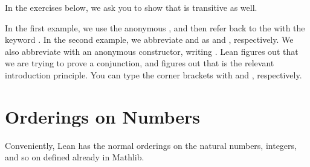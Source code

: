 \documentclass[letterpaper,10pt,english]{sphinxmanual}
\begin{document}
\sphinxAtStartPar
In the exercises below, we ask you to show that  is transitive as well.

\sphinxAtStartPar
In the first example,
we use the anonymous ,
and then refer back to the  with the keyword .
In the second example,
we abbreviate  and  as  and ,
respectively.
We also abbreviate  with an anonymous constructor,
writing .
Lean figures out that we are trying to prove a conjunction,
and figures out that  is the relevant introduction principle.
You can type the corner brackets with \sphinxcode{\sphinxupquote{\textbackslash{}<}} and \sphinxcode{\sphinxupquote{\textbackslash{}>}}, respectively.


\section{Orderings on Numbers}
\label{\detokenize{relations_in_lean:orderings-on-numbers}}
\sphinxAtStartPar
Conveniently,
Lean has the normal orderings on the natural numbers, integers,
and so on defined already in Mathlib.
\end{document}
